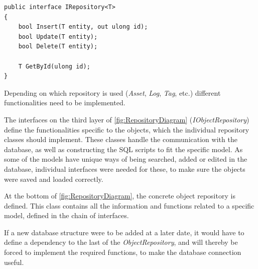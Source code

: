 \begin{listing}[H]
\begin{verbatim}
public interface IRepository<T>
{
    bool Insert(T entity, out ulong id);
    bool Update(T entity);
    bool Delete(T entity);

    T GetById(ulong id);
}

\end{verbatim}
\label{code:IRepository}
\end{listing}
\par
Depending on which repository is used (\textit{Asset}, \textit{Log}, \textit{Tag}, etc.) different functionalities need to be implemented. 
\par
The interfaces on the third layer of \autoref{fig:RepositoryDiagram} (\textit{IObjectRepository}) define the functionalities specific to the objects, which the individual repository classes should implement. These classes handle the communication with the database, as well as constructing the SQL scripts to fit the specific model. As some of the models have unique ways of being searched, added or edited in the database, individual interfaces were needed for these, to make sure the objects were saved and loaded correctly.
\par
At the bottom of \autoref{fig:RepositoryDiagram}, the concrete object repository is defined. This class contains all the information and functions related to a specific model, defined in the chain of interfaces.
\par
If a new database structure were to be added at a later date, it would have to define a dependency to the last of the \textit{ObjectRepository}, and will thereby be forced to implement the required functions, to make the database connection useful.
